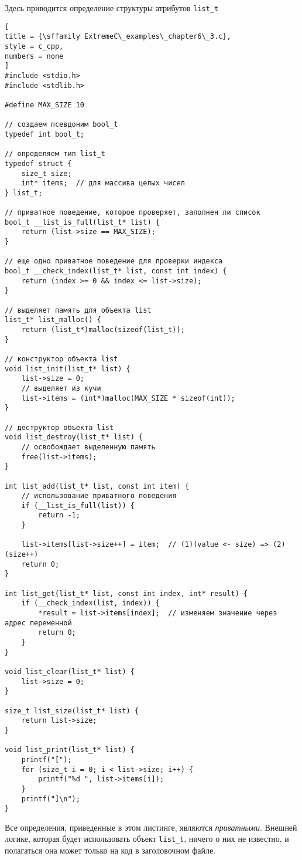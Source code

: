 \documentclass[%
	11pt,
	a4paper,
	utf8,
		]{article}
\begin{document}
Здесь приводится определение структуры атрибутов \verb|list_t|
\begin{lstlisting}[
title = {\sffamily ExtremeC\_examples\_chapter6\_3.c},
style = c_cpp,
numbers = none
]
#include <stdio.h>
#include <stdlib.h>

#define MAX_SIZE 10

// создаем псевдоним bool_t
typedef int bool_t;

// определяем тип list_t
typedef struct {
    size_t size;
    int* items;  // для массива целых чисел
} list_t;

// приватное поведение, которое проверяет, заполнен ли список
bool_t __list_is_full(list_t* list) {
    return (list->size == MAX_SIZE);
}

// еще одно приватное поведение для проверки индекса
bool_t __check_index(list_t* list, const int index) {
    return (index >= 0 && index <= list->size);
}

// выделяет память для объекта list
list_t* list_malloc() {
    return (list_t*)malloc(sizeof(list_t));
}

// конструктор объекта list
void list_init(list_t* list) {
    list->size = 0;
    // выделяет из кучи
    list->items = (int*)malloc(MAX_SIZE * sizeof(int));
}

// деструктор объекта list
void list_destroy(list_t* list) {
    // освобождает выделенную память
    free(list->items);
}

int list_add(list_t* list, const int item) {
    // использование приватного поведения
    if (__list_is_full(list)) {
        return -1;
    }
    
    list->items[list->size++] = item;  // (1)(value <- size) => (2)(size++)
    return 0;
}

int list_get(list_t* list, const int index, int* result) {
    if (__check_index(list, index)) {
        *result = list->items[index];  // изменяем значение через адрес переменной
        return 0;
    }
}

void list_clear(list_t* list) {
    list->size = 0;
}

size_t list_size(list_t* list) {
    return list->size;
}

void list_print(list_t* list) {
    printf("[");
    for (size_t i = 0; i < list->size; i++) {
        printf("%d ", list->items[i]);
    }
    printf("]\n");
}
\end{lstlisting}

Все определения, приведенные в этом листинге, являются \emph{приватными}. Внешней логике, которая будет использовать объект \verb|list_t|, ничего о них не известно, и полагаться она может только на код в заголовочном файле.
\end{document}
